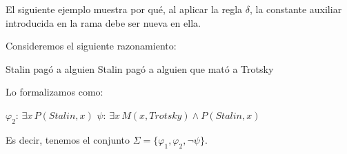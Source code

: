 El siguiente ejemplo muestra por qué, al aplicar la regla $\delta$, la constante auxiliar introducida en la rama debe ser nueva en ella.

\begin{example}
Consideremos el siguiente razonamiento:
\begin{center}
{Stalin pagó a alguien} 
{Stalin pagó a alguien que mató a Trotsky}
\end{center}

Lo formalizamos como:
\begin{center}
{$\varphi_2$: $\exists x \, P(Stalin, x)$}
{$\psi$: $\exists x \,  M(x, Trotsky) \land P(Stalin, x)$}
\end{center}

Es decir, tenemos el conjunto $\Sigma = \{\varphi_1, \varphi_2, \neg \psi \}$.


\end{example}
